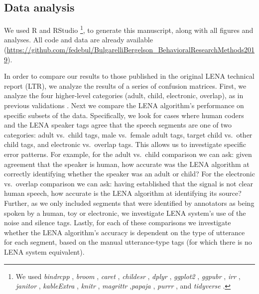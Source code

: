 \documentclass[man,floatsintext]{apa6}
\let\rmarkdownfootnote\footnote%
\def\footnote{\protect\rmarkdownfootnote}
\theoremstyle{definition}
\theoremstyle{definition}
\theoremstyle{definition}
\theoremstyle{remark}
\begin{document}
\hypertarget{data-analysis}{%
\subsection{Data analysis}\label{data-analysis}}

We used R and RStudio \citep[Version 3.4.3;][]{R-base}\footnote{We used
  \emph{bindrcpp} \citep[Version 0.2.2;][]{R-bindrcpp}, \emph{broom}
  \citep[Version 0.5.0;][]{R-broom}, \emph{caret} \citep[Version
  6.0.80;][]{R-caret}, \emph{childesr} \citep[Version
  0.1.0;][]{R-childesr}, \emph{dplyr} \citep[Version
  0.8.0.1;][]{R-dplyr}, \emph{ggplot2} \citep[Version
  3.1.0;][]{R-ggplot2}, \emph{ggpubr} \citep[Version 0.2;][]{R-ggpubr},
  \emph{irr} \citep[Version 0.84.1;][]{R-irr}, \emph{janitor}
  \citep[Version 1.1.1;][]{R-janitor}, \emph{kableExtra} \citep[Version
  1.0.1;][]{R-kableExtra}, \emph{knitr} \citep[Version
  1.21;][]{R-knitr}, \emph{magrittr} \citep[Version
  1.5;][]{R-magrittr},\emph{papaja} \citep[Version
  0.1.0.9842;][]{R-papaja}, \emph{purrr} \citep[Version
  0.3.2;][]{R-purrr}, and \emph{tidyverse} \citep[Version
  1.2.1;][]{R-tidyverse}.}, to generate this manuscript, along with all
figures and analyses. All code and data are already available
(\url{https://github.com/fedebul/BulgarelliBergelson_BehavioralResearchMethods2019}).

In order to compare our results to those published in the original LENA
technical report (LTR), we analyze the results of a series of confusion
matrices. First, we analyze the four higher-level categories (adult,
child, electronic, overlap), as in previous validations \citep{Xu2009}.
Next we compare the LENA algorithm's performance on specific subsets of
the data. Specifically, we look for cases where human coders and the
LENA speaker tags agree that the speech segments are one of two
categories: adult vs.~child tags, male vs.~female adult tags, target
child vs.~other child tags, and electronic vs.~overlap tags. This allows
us to investigate specific error patterns. For example, for the adult
vs.~child comparison we can ask: given agreement that the speaker is
human, how accurate was the LENA algorithm at correctly identifying
whether the speaker was an adult or child? For the electronic
vs.~overlap comparison we can ask: having established that the signal is
not clear human speech, how accurate is the LENA algorithm at
identifying its source? Further, as we only included segments that were
identified by annotators as being spoken by a human, toy or electronic,
we investigate LENA system's use of the noise and silence tags. Lastly,
for each of these comparisons we investigate whether the LENA
algorithm's accuracy is dependent on the type of utterance for each
segment, based on the manual utterance-type tags (for which there is no
LENA system equivalent).
\end{document}
